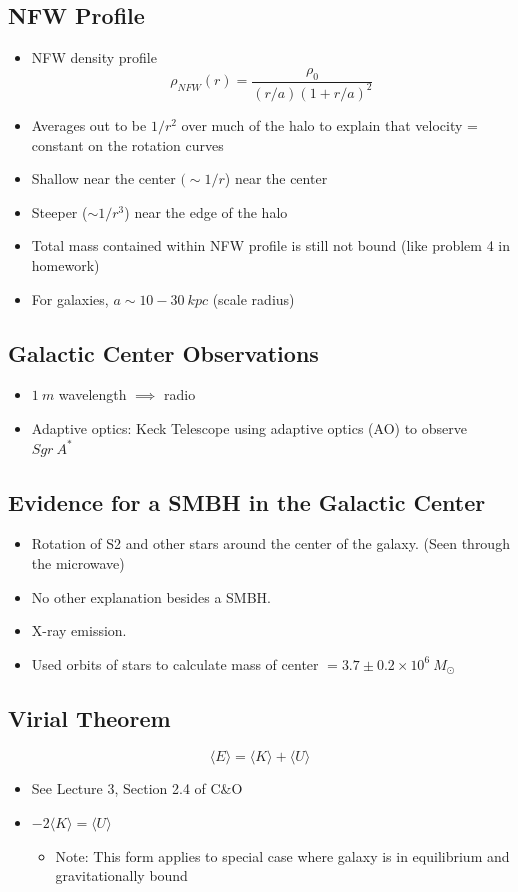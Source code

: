 \documentclass{book}
\begin{document}
\subsection{NFW Profile}
\begin{itemize}
    \item NFW density profile
          \begin{equation*}
              \rho_{NFW} (r) = \frac{\rho_0}{(r/a)(1+r/a)^2} \tag{C\&O 24.52}
          \end{equation*}
    \item Averages out to be $1/r^2$ over much of the halo to explain that velocity = constant on the rotation curves
    \item Shallow near the center $(\sim 1/r$) near the center
    \item Steeper ($\sim 1/r^3$) near the edge of the halo
    \item Total mass contained within NFW profile is still not bound (like problem 4 in homework)
    \item For galaxies, $a \sim 10-30\ kpc$ (scale radius)
\end{itemize}
\subsection{Galactic Center Observations}
\begin{itemize}
    \item $1\ m$ wavelength $\implies$ radio
    \item Adaptive optics: Keck Telescope using adaptive optics (AO) to observe $Sgr\ A^*$
\end{itemize}
\subsection{Evidence for a SMBH in the Galactic Center}
\begin{itemize}
    \item Rotation of S2 and other stars around the center of the galaxy. (Seen through the microwave)
    \item No other explanation besides a SMBH.
    \item X-ray emission.
    \item Used orbits of stars to calculate mass of center $= 3.7 \pm 0.2 \times 10^6\ M_\odot$
\end{itemize}
\subsection{Virial Theorem}
\begin{equation*}
    \langle E \rangle = \langle K \rangle + \langle U \rangle
\end{equation*}
\begin{itemize}
    \item See Lecture 3, Section 2.4 of C\&O
    \item $-2 \langle K \rangle = \langle U \rangle$
          \begin{itemize}
              \item Note: This form applies to special case where galaxy is in equilibrium and gravitationally bound
          \end{itemize}
\end{itemize}
\end{document}
